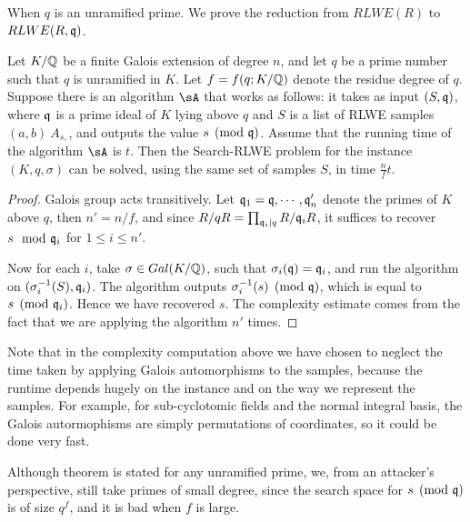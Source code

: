 \documentclass{article}
\begin{document}
When $q$ is an unramified prime. We prove the reduction from $RLWE(R)$ to $RLWE(R,\mathfrak{q})$.
\begin{theorem}
Let $K/\mathbb{Q}$ be a finite Galois extension of degree $n$, and let $q$ be a prime number such that $q$ is unramified in $K$. Let $f = f(q; K/\mathbb{Q})$ denote the residue degree of $q$. Suppose there is an algorithm $\sA$ that works as follows: it takes as input $(S, \mathfrak{q})$, where $\mathfrak{q}$ is a prime ideal of $K$ lying above $q$ and $S$ is a list of RLWE samples $(a,b) ~ A_{s, }$, and outputs the value $s \pmod{\mathfrak{q}}$. Assume that the running time of the algorithm $\sA$ is $t$. Then the Search-RLWE problem for the instance $(K, q, \sigma)$ can be solved,  using the same set of samples $S$, in time $\frac{n}{f}t$.
\end{theorem}

\begin{proof}
Galois group acts transitively.  Let $\mathfrak{q}_1 = \mathfrak{q}, \cdots, \mathfrak{q}_n'$ denote the primes of $K$ above $q$, then $n' = n/f$, and since $R/qR = \prod_{\mathfrak{q}_i | q} R/\mathfrak{q}_i R$, it suffices to recover $s \mod {\mathfrak{q}_i}$ for $1 \leq i \leq n'$.

Now for each $i$, take $\sigma \in Gal(K/\mathbb{Q})$, such that $\sigma_i(\mathfrak{q}) = \mathfrak{q}_i$, and run the algorithm on  $(\sigma_i^{-1}(S), \mathfrak{q}_i)$. The algorithm outputs $\sigma_i^{-1}(s) \pmod{\mathfrak{q}}$, which is equal to $s \pmod{\mathfrak{q}_i}$. Hence we have recovered $s$. The complexity estimate comes from the fact that we are applying the algorithm $n'$ times.
\end{proof}

\begin{remark}
Note that in the complexity computation above we have chosen to neglect the time taken by applying Galois automorphisms to the samples, because the runtime depends
hugely on the instance and on the way we represent the samples. For example, for sub-cyclotomic fields and the normal integral basis, the Galois autormophisms are simply permutations of coordinates, so it could be done very fast.
\end{remark}

\begin{remark}
Although theorem is stated for any unramified prime, we, from an attacker's perspective, still take primes of small degree, since the search space for $s \pmod{\mathfrak{q}}$ is of size $q^f$, and it is bad when $f$ is large.
\end{remark}


\begin{Corollary}

\end{Corollary}
\end{document}
